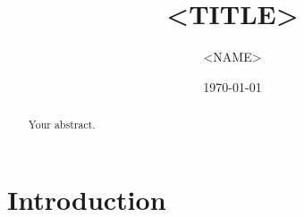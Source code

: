\documentclass{article}
\title{<TITLE>}
\author{<NAME>}
\date{\today}
\begin{document}
\maketitle

\begin{abstract}
Your abstract.
\end{abstract}

\section{Introduction}
% 
% 
\end{document}
